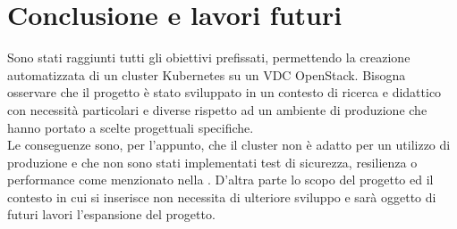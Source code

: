 \documentclass[12pt,a4paper,openright,twoside]{book}
\begin{document}
\chapter{Conclusione e lavori futuri}
Sono stati raggiunti tutti gli obiettivi prefissati, permettendo la creazione automatizzata di un cluster Kubernetes su un VDC OpenStack.
Bisogna osservare che il progetto è stato sviluppato in un contesto di ricerca e didattico con necessità particolari e diverse rispetto ad 
un ambiente di produzione che hanno portato a scelte progettuali specifiche.\\
Le conseguenze sono, per l'appunto, che il cluster non è adatto per un utilizzo di produzione e che non sono stati implementati test di sicurezza, resilienza o performance
come menzionato nella .
D'altra parte lo scopo del progetto ed il contesto in cui si inserisce non necessita di ulteriore sviluppo e sarà oggetto di futuri lavori l'espansione del progetto.
\end{document}
